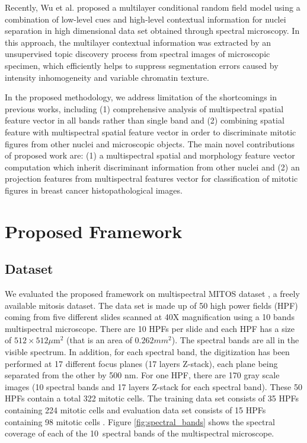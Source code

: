 \documentclass[10pt,twocolumn,letterpaper]{article}
\begin{document}
Recently, Wu et al. \cite{wu2012} proposed a multilayer conditional random field model using a combination of low-level cues and high-level contextual information for nuclei separation in high dimensional data set obtained through spectral microscopy. In this approach, the multilayer contextual information was extracted by an unsupervised topic discovery process from spectral images of microscopic specimen, which efficiently helps to suppress segmentation errors caused by intensity inhomogeneity and variable chromatin texture.

In the proposed methodology, we address limitation of the shortcomings in previous works, including (1) comprehensive analysis of multispectral spatial feature vector in all bands rather than single band \cite{masood2009,wu2009,wu2012} and (2) combining spatial feature with multispectral spatial feature vector in order to discriminate mitotic figures from other nuclei and microscopic objects. The main novel contributions of proposed work are: (1) a multispectral spatial and morphology feature vector computation which inherit discriminant information from other nuclei and (2) an projection features from multispectral features vector for classification of mitotic figures in breast cancer histopathological images.

\section{Proposed Framework}
\label{sec:framework}
\subsection{Dataset}

We evaluated the proposed framework on multispectral MITOS dataset \cite{mITOS2012}, a freely available mitosis dataset. The data set is made up of 50 high power fields (HPF) coming from five different slides scanned at 40X magnification using a 10 bands multispectral microscope. There are 10 HPFs per slide and each HPF has a size of $512\times512\mu\text{m}^2$ (that is an area of $0.262mm^2$). The spectral bands are all in the visible spectrum. In addition, for each spectral band, the digitization has been performed at 17 different focus planes (17 layers Z-stack), each plane being separated from the other by 500 nm. For one HPF, there are 170 gray scale images (10 spectral bands and 17 layers Z-stack for each spectral band). These 50 HPFs contain a total 322 mitotic cells. The training data set consists of 35 HPFs containing 224 mitotic cells and evaluation data set consists of 15 HPFs containing 98 mitotic cells \cite{roux2013}. Figure \ref{fig:spectral_bands} shows the spectral coverage of each of the 10~spectral bands of the multispectral microscope.
\end{document}
